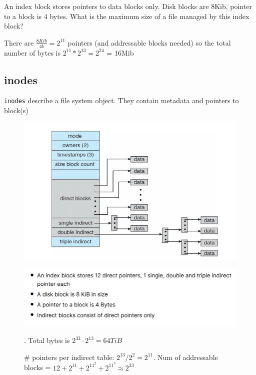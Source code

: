 \documentclass[../notes.tex]{subfiles}
\begin{document}
\begin{example}
    An index block stores pointers to data blocks only. Disk blocks are 8Kib, pointer to a block is 4 bytes. What is the maximum size of a file managed by this index block?

    There are $ \frac{8Kib}{4b} = 2^{11} $ pointers (and addressable blocks needed) so the total number of bytes is $ 2^{11 } * 2 ^{ 13 } = 2^{24} $ = 16Mib



\end{example}





\subsection{inodes}

\texttt{inodes} describe a file system object. They contain metadata and pointers to block(s)

\begin{figure}[H]
    \centering
    \includegraphics[width=0.8\linewidth]{img/image_2023-03-16-17-48-45.png}
\end{figure}


\begin{figure}[H]
    \centering
    \includegraphics[width=0.8\linewidth]{img/image_2023-03-16-17-49-55.png}
    \caption{# pointers per indirect table: $2^{13}/2^2 = 2^{11}$. Num of addressable blocks = $ 12 + 2^{11} + 2^{11}^2 + 2^{11}^3 \approx 2^{33} $}. Total bytes is $ 2^{33} \cdot  2^{13} = 64 TiB $
\end{figure}
\end{document}
